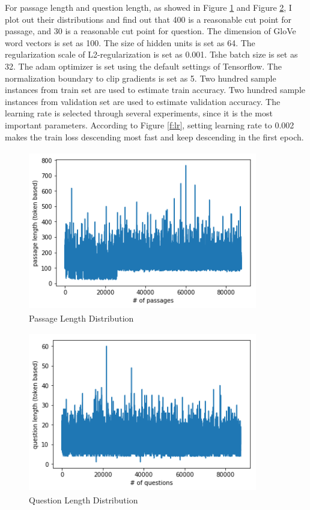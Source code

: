 \documentclass[modernstyle,12pt]{sjsuthesis}
\theoremstyle{definition}
\begin{document}
For passage length and question length, as showed in Figure \ref{f:passage_length} and Figure \ref{f:question_length}, I plot out their distributions and find out that 400 is a reasonable cut point for passage, and 30 is a reasonable cut point for question. The dimension of GloVe word vectors is set as 100. The size of hidden units is set as 64. The regularization scale of L2-regularization is set as 0.001. Tshe batch size is set as 32. The adam optimizer is set using the default settings of Tensorflow. The normalization boundary to clip gradients is set as 5. Two hundred sample instances from train set are used to estimate train accuracy. Two hundred sample instances from validation set are used to estimate validation accuracy. The learning rate is selected through several experiments, since it is the most important parameters. According to Figure \ref{f:lr}, setting learning rate to 0.002 makes the train loss descending most fast and keep descending in the first epoch.

\begin{figure}[htbp]\centering
  \includegraphics[width=10cm, height=7cm]{figures/passage_length.png}
  \caption{Passage Length Distribution}
  \label{f:passage_length}
\end{figure}

\begin{figure}[htbp]\centering
  \includegraphics[width=10cm, height=7cm]{figures/question_length.png}
  \caption{Question Length Distribution}
  \label{f:question_length}
\end{figure}
\end{document}
